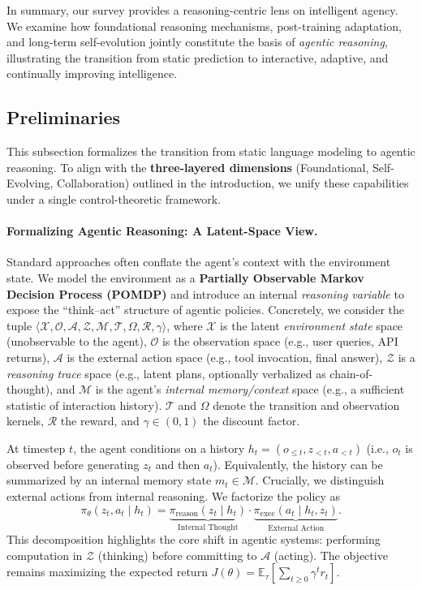 In summary, our survey provides a reasoning-centric lens on intelligent agency.
We examine how foundational reasoning mechanisms, post-training adaptation, and long-term self-evolution jointly constitute the basis of \emph{agentic reasoning}, illustrating the transition from static prediction to interactive, adaptive, and continually improving intelligence.


\subsection{Preliminaries}
\label{sec:prelims}

This subsection formalizes the transition from static language modeling to agentic reasoning. To align with the \textbf{three-layered dimensions} (Foundational, Self-Evolving, Collaboration) outlined in the introduction, we unify these capabilities under a single {control-theoretic framework}.

\paragraph{Formalizing Agentic Reasoning: A Latent-Space View.}
Standard approaches often conflate the agent's context with the environment state. We model the environment as a \textbf{Partially Observable Markov Decision Process (POMDP)} and introduce an internal \emph{reasoning variable} to expose the ``think--act'' structure of agentic policies. Concretely, we consider the tuple
$\langle \mathcal{X}, \mathcal{O}, \mathcal{A}, \mathcal{Z}, \mathcal{M}, \mathcal{T}, \Omega, \mathcal{R}, \gamma \rangle$, where
$\mathcal{X}$ is the latent \emph{environment state} space (unobservable to the agent),
$\mathcal{O}$ is the observation space (e.g., user queries, API returns),
$\mathcal{A}$ is the external action space (e.g., tool invocation, final answer),
$\mathcal{Z}$ is a \emph{reasoning trace} space (e.g., latent plans, optionally verbalized as chain-of-thought),
and $\mathcal{M}$ is the agent's \emph{internal memory/context} space (e.g., a sufficient statistic of interaction history).
$\mathcal{T}$ and $\Omega$ denote the transition and observation kernels, $\mathcal{R}$ the reward, and $\gamma\in(0,1)$ the discount factor.

At timestep $t$, the agent conditions on a history
$h_t = (o_{\le t}, z_{<t}, a_{<t})$ (i.e., $o_t$ is observed before generating $z_t$ and then $a_t$).
Equivalently, the history can be summarized by an internal memory state $m_t\in\mathcal{M}$.
Crucially, we distinguish external actions from internal reasoning. We factorize the policy as
\begin{equation}
\label{eq:policy_decomp}
\pi_\theta(z_t, a_t \mid h_t)
= \underbrace{\pi_{\text{reason}}(z_t \mid h_t)}_{\text{Internal Thought}}
\cdot \underbrace{\pi_{\text{exec}}(a_t \mid h_t, z_t)}_{\text{External Action}}.
\end{equation}
This decomposition highlights the core shift in agentic systems: performing computation in $\mathcal{Z}$ (thinking) before committing to $\mathcal{A}$ (acting). The objective remains maximizing the expected return
$J(\theta)=\mathbb{E}_{\tau}\!\left[\sum_{t\ge 0}\gamma^t r_t\right]$.

